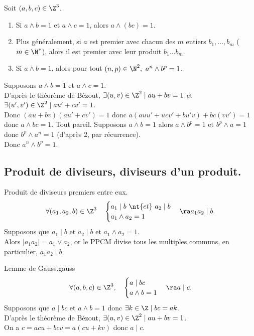 \documentclass[11pt]{article}
\begin{document}
\begin{corr}{}{}
    Soit $(a,b,c)\in\Z^3$.
    \begin{enumerate}[topsep=0pt,itemsep=-0.9 ex]
        \item Si $a\land b=1$ et $a\land c=1$, alors $a\land(bc)=1$.
        \item Plus généralement, si $a$ est premier avec chacun des $m$ entiers $b_1,...,b_m$ ($m\in\N^*$), alors il est premier avec leur produit $b_1...b_m$.
        \item Si $a\land b=1$, alors pour tout $(n,p)\in\N^2,~a^n\land b^p=1$.
    \end{enumerate}
    \tcblower
     Supposons $a\land b=1$ et $a\land c = 1$.\\
    D'après le théorème de Bézout, $\exists (u,v)\in\Z^2 \mid au+bv=1$ et $\exists (u',v')\in\Z^2 \mid au'+cv'=1$.\\
    Donc $(au+bv)(au'+cv')=1$ donc $a(auu'+ucv'+bu'v)+bc(vv')=1$ donc $a\land bc = 1$.\n
     Tout pareil.\n
     Supposons $a\land b=1$ alors $a\land b^p=1$ et $b^p\land a = 1$ donc $b^p\land a^n=1$ (d'après 2, par récurrence).\\
    Donc $a^n\land b^p=1$.
\end{corr}

\subsection{Produit de diviseurs, diviseurs d'un produit.}

\begin{prop}{Produit de diviseurs premiers entre eux.}{}
    \begin{equation*}
        \forall (a_1,a_2,b)\in\Z^3\quad\begin{cases}
            a_1\mid b ~ \nt{ et } ~ a_2\mid b\\ a_1\land a_2=1
        \end{cases} 
        \ra a_1a_2\mid b.
    \end{equation*}
    \tcblower  
    Supposons que $a_1\mid b$ et $a_2\mid b$ et $a_1\land a_2=1$.\\
    Alors $|a_1a_2|=a_1\lor a_2$, or le PPCM divise tous les multiples communs, en particulier, $a_1a_2\mid b$.
\end{prop}

\begin{thm}{Lemme de Gauss.}{gauss}
    \begin{equation*}
        \forall(a,b,c)\in\Z^3,\quad\begin{cases}
            a\mid bc\\
            a\land b = 1
        \end{cases}\ra a \mid c.
    \end{equation*}
    \tcblower
    Supposons que $a\mid bc$ et $a\land b=1$ donc $\exists k \in \Z \mid bc = ak$.\\
    D'après le théorème de Bézout, $\exists (u,v)\in\Z^2\mid au+bv=1$.\\
    On a $c=acu+bcv=a(cu+kv)$ donc $a\mid c$.
\end{thm}
\end{document}

